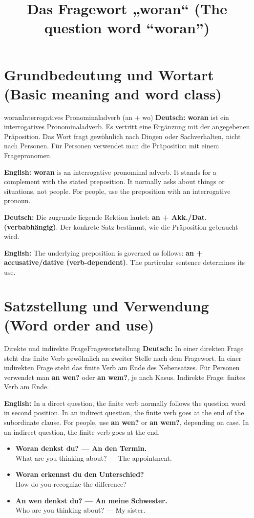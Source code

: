 \documentclass[a4paper,11pt]{article}
\title{Das Fragewort „woran“ (The question word “woran”)}
\date{}
\newcommand{\GermanText}[1]{\textbf{Deutsch: }#1\par}
\newcommand{\EnglishText}[1]{{\small\color{SoftGray}\textbf{English: }#1\par}}
\newcommand{\ExampleItem}[2]{\item \textbf{#1}\\{\small\color{SoftGray}#2}}
\begin{document}
\maketitle
\tableofcontents
\newpage
\section{Grundbedeutung und Wortart (Basic meaning and word class)}
\begin{grammarentry}{woran}{Interrogatives Pronominaladverb (an + wo)}
\GermanText{\textbf{woran} ist ein interrogatives Pronominaladverb. Es vertritt eine Ergänzung mit der angegebenen Präposition. Das Wort fragt gewöhnlich nach Dingen oder Sachverhalten, nicht nach Personen. Für Personen verwendet man die Präposition mit einem Fragepronomen.}
\EnglishText{\textbf{woran} is an interrogative pronominal adverb. It stands for a complement with the stated preposition. It normally asks about things or situations, not people. For people, use the preposition with an interrogative pronoun.}
\GermanText{Die zugrunde liegende Rektion lautet: \textbf{an + Akk./Dat. (verbabhängig)}. Der konkrete Satz bestimmt, wie die Präposition gebraucht wird.}
\EnglishText{The underlying preposition is governed as follows: \textbf{an + accusative/dative (verb-dependent)}. The particular sentence determines its use.}
\end{grammarentry}
\section{Satzstellung und Verwendung (Word order and use)}
\begin{grammarentry}{Direkte und indirekte Frage}{Fragewortstellung}
\GermanText{In einer direkten Frage steht das finite Verb gewöhnlich an zweiter Stelle nach dem Fragewort. In einer indirekten Frage steht das finite Verb am Ende des Nebensatzes. Für Personen verwendet man \textbf{an wen?} oder \textbf{an wem?}, je nach Kasus. Indirekte Frage: finites Verb am Ende.}
\EnglishText{In a direct question, the finite verb normally follows the question word in second position. In an indirect question, the finite verb goes at the end of the subordinate clause. For people, use \textbf{an wen?} or \textbf{an wem?}, depending on case. In an indirect question, the finite verb goes at the end.}
\end{grammarentry}
\begin{exbox}\begin{itemize}
\ExampleItem{Woran denkst du? — An den Termin.}{What are you thinking about? — The appointment.}
\ExampleItem{Woran erkennst du den Unterschied?}{How do you recognize the difference?}
\ExampleItem{An wen denkst du? — An meine Schwester.}{Who are you thinking about? — My sister.}
\end{itemize}\end{exbox}
\end{document}
